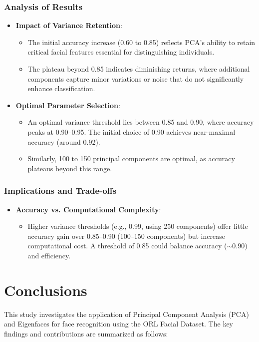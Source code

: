 \documentclass{article}
\begin{document}
	\subsubsection{Analysis of Results}
	\begin{itemize}
		\item \textbf{Impact of Variance Retention}:
		\begin{itemize}
			\item The initial accuracy increase (0.60 to 0.85) reflects PCA's ability to retain critical facial features essential for distinguishing individuals.
			\item The plateau beyond 0.85 indicates diminishing returns\cite{Jolliffe2002}, where additional components capture minor variations or noise that do not significantly enhance classification.
		\end{itemize}
		
		\item \textbf{Optimal Parameter Selection}:
		\begin{itemize}
			\item An optimal variance threshold lies between 0.85 and 0.90, where accuracy peaks at 0.90–0.95. The initial choice of 0.90 achieves near-maximal accuracy (around 0.92).
			\item Similarly, 100 to 150 principal components are optimal, as accuracy plateaus beyond this range.
		\end{itemize}
	\end{itemize}
	
	\subsubsection{Implications and Trade-offs}
	\begin{itemize}
		\item \textbf{Accuracy vs. Computational Complexity}:
		\begin{itemize}
			\item Higher variance thresholds (e.g., 0.99, using 250 components) offer little accuracy gain over 0.85–0.90 (100–150 components) but increase computational cost. A threshold of 0.85 could balance accuracy ($\sim$0.90) and efficiency.
		\end{itemize}
	\end{itemize}	
	\section{Conclusions}
	This study investigates the application of Principal Component Analysis (PCA) and Eigenfaces for face recognition using the ORL Facial Dataset. The key findings and contributions are summarized as follows\cite{Belhumeur1997}:
	
\end{document}
